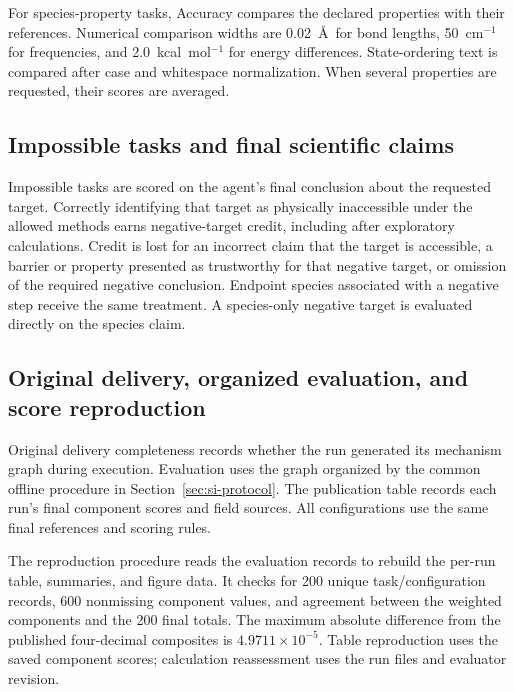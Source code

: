 For species-property tasks, Accuracy compares the declared properties with their references. Numerical comparison widths are 0.02~\AA\ for bond lengths, 50~cm$^{-1}$ for frequencies, and 2.0~kcal~mol$^{-1}$ for energy differences. State-ordering text is compared after case and whitespace normalization. When several properties are requested, their scores are averaged.

\subsection{Impossible tasks and final scientific claims}
Impossible tasks are scored on the agent's final conclusion about the requested target. Correctly identifying that target as physically inaccessible under the allowed methods earns negative-target credit, including after exploratory calculations. Credit is lost for an incorrect claim that the target is accessible, a barrier or property presented as trustworthy for that negative target, or omission of the required negative conclusion. Endpoint species associated with a negative step receive the same treatment. A species-only negative target is evaluated directly on the species claim.

\subsection{Original delivery, organized evaluation, and score reproduction}
Original delivery completeness records whether the run generated its mechanism graph during execution. Evaluation uses the graph organized by the common offline procedure in Section~\ref{sec:si-protocol}. The publication table records each run's final component scores and field sources. All configurations use the same final references and scoring rules.

The reproduction procedure reads the evaluation records to rebuild the per-run table, summaries, and figure data. It checks for 200 unique task/configuration records, 600 nonmissing component values, and agreement between the weighted components and the 200 final totals. The maximum absolute difference from the published four-decimal composites is $4.9711\times10^{-5}$. Table reproduction uses the saved component scores; calculation reassessment uses the run files and evaluator revision.
